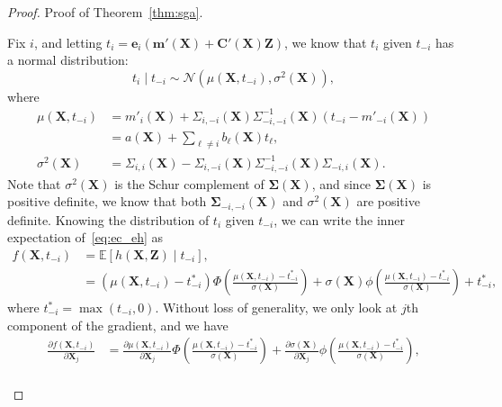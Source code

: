 \documentclass[paper=letter]{scrartcl}
\newcommand{\E}{\mathbb{E}}
\begin{document}
\begin{proof}{Proof of Theorem~\ref{thm:sga}.}
\begin{enumerate}
      Fix $i$, and letting $t_i = \bm{e}_i \left( \bm{m}'(\bm{X}) + \bm{C}'(\bm{X}) \bm{Z} \right)$, we know that $t_i$ given $t_{-i}$ has a normal
      distribution: 
      \begin{equation*}
          t_i \mid t_{-i} \sim \mathcal{N}\left(\mu(\bm{X}, t_{-i}), \sigma^2(\bm{X})\right),
      \end{equation*}
      where
      \begin{equation*}
       \begin{split}
      \mu(\bm{X}, t_{-i}) &= m'_i(\bm{X}) + \Sigma_{i, -i}(\bm{X}) \Sigma_{-i, -i}^{-1}(\bm{X}) \left(t_{-i} - m'_{-i}(\bm{X}) \right) \\
      &= a(\bm{X}) + \sum_{\ell \ne i} b_{\ell}(\bm{X}) t_{\ell},\\
      \sigma^2(\bm{X}) &= \Sigma_{i,i}(\bm{X}) - \Sigma_{i,-i}(\bm{X}) \Sigma_{-i,-i}^{-1}(\bm{X}) \Sigma_{-i,i}(\bm{X}).
       \end{split}
      \end{equation*}
       Note that $\sigma^2(\bm{X})$ is the Schur complement of $\bm{\Sigma}(\bm{X})$, and
       since $\bm{\Sigma}(\bm{X})$ is positive definite, we know that both $\bm{\Sigma}_{-i,-i}(\bm{X})$ and $\sigma^2(\bm{X})$ are positive definite. Knowing the distribution of $t_i$ given $t_{-i}$, we can write the inner expectation of~\eqref{eq:ec_eh} as
      \begin{equation} \label{eq:ec_f}
      \begin{split}
       f(\bm{X}, t_{-i}) &= \E \left[ h(\bm{X}, \bm{Z}) \mid t_{-i} \right],\\
       &= \left(\mu(\bm{X}, t_{-i}) - t_{-i}^*\right) \Phi\left( \frac{\mu(\bm{X}, t_{-i})-t_{-i}^*}{\sigma(\bm{X})}\right) + \sigma(\bm{X}) \phi \left(\frac{\mu(\bm{X}, t_{-i})-t_{-i}^*}{\sigma(\bm{X})}\right) + t_{-i}^*,
      \end{split}
      \end{equation}
      where $t_{-i}^* = \max(t_{-i}, 0)$. Without loss of generality, we only look at $j$th component of the gradient, and we have
      \begin{equation} \label{eq:ec_df}
      \begin{split}
       \frac{\partial f(\bm{X}, t_{-i})}{\partial \bm{X}_j} &= \frac{\partial \mu(\bm{X}, t_{-i})}{\partial \bm{X}_j} \Phi \left(\frac{\mu(\bm{X}, t_{-i})-t^*_{-i}}{\sigma(\bm{X})} \right) + \frac{\partial \sigma(\bm{X})}{\partial \bm{X}_j} \phi \left(\frac{\mu(\bm{X}, t_{-i})-t^*_{-i}}{\sigma(\bm{X})} \right), \\

\end{split}
\end{equation}
\end{enumerate}
\end{proof}
\end{document}
